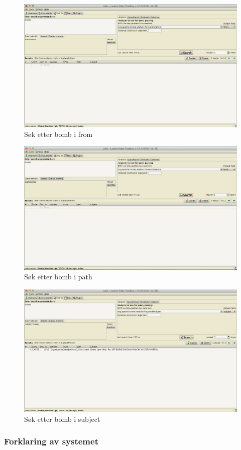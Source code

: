 \begin{figure}[p]
\centering
\includegraphics[scale=0.31]{images/bombfrom.png}
\caption{Søk etter bomb i from}
\end{figure}

\begin{figure}[p]
\centering
\includegraphics[scale=0.31]{images/bombpath.png}
\caption{Søk etter bomb i path}
\end{figure}

\begin{figure}[p]
\centering
\includegraphics[scale=0.31]{images/bombsubject.png}
\caption{Søk etter bomb i subject}
\end{figure}

\subsubsection*{Forklaring av systemet}
